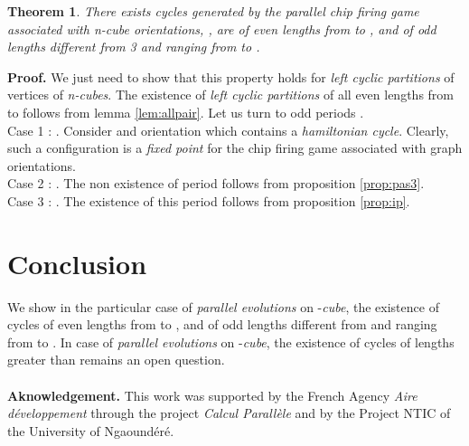 \documentclass{article}
\newtheorem{theorem}{Theorem}
\begin{document}
\begin{theorem}  \label{th:main}
There exists cycles generated by the parallel chip firing game associated with n-cube
orientations, , are of even lengths from  to , and of odd
lengths different from 3 and ranging from  to .
\end{theorem}
{\bf Proof.} We just need to show that this property holds for {\em left
  cyclic partitions} of vertices of {\em n-cubes}. The existence of {\em left cyclic partitions} of all even lengths
 from  to  follows from lemma \ref{lem:allpair}. Let us turn to odd periods . \\
 Case 1 : . Consider and orientation which contains a {\em
  hamiltonian cycle}. Clearly, such a configuration is a {\em fixed point} for
  the chip firing game associated with graph orientations. \\
 Case 2 : . The non existence of period  follows from proposition \ref{prop:pas3}. \\
 Case 3 : . The existence of this period
follows from proposition \ref{prop:ip}. \\


\section{Conclusion}
 We show in the particular case of {\em parallel evolutions} on -{\em cube}, 
 the existence of cycles of even lengths from  to , and of odd lengths different
 from  and ranging from  to . In case of {\em parallel evolutions} on 
 -{\em cube}, the existence of cycles of lengths greater than  remains an open question. \\
\\
{\bf Aknowledgement.} This work was supported by the French Agency
 {\em Aire d\'eveloppement} through the project {\em Calcul Parall\`ele} and
 by the Project NTIC of the University of Ngaound\'er\'e.


\end{document}

